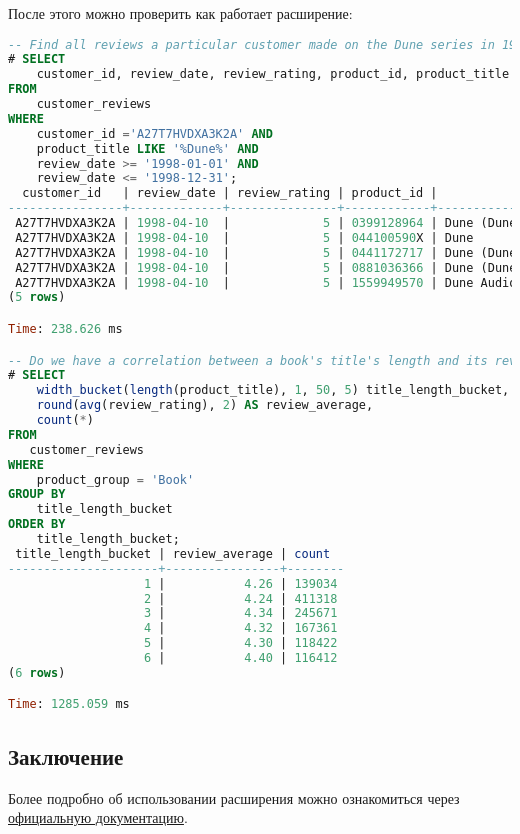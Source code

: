 После этого можно проверить как работает расширение:

\begin{lstlisting}[language=SQL,label=lst:cstore5,caption=Cstore запросы]
-- Find all reviews a particular customer made on the Dune series in 1998.
# SELECT
    customer_id, review_date, review_rating, product_id, product_title
FROM
    customer_reviews
WHERE
    customer_id ='A27T7HVDXA3K2A' AND
    product_title LIKE '%Dune%' AND
    review_date >= '1998-01-01' AND
    review_date <= '1998-12-31';
  customer_id   | review_date | review_rating | product_id |                 product_title
----------------+-------------+---------------+------------+-----------------------------------------------
 A27T7HVDXA3K2A | 1998-04-10  |             5 | 0399128964 | Dune (Dune Chronicles (Econo-Clad Hardcover))
 A27T7HVDXA3K2A | 1998-04-10  |             5 | 044100590X | Dune
 A27T7HVDXA3K2A | 1998-04-10  |             5 | 0441172717 | Dune (Dune Chronicles, Book 1)
 A27T7HVDXA3K2A | 1998-04-10  |             5 | 0881036366 | Dune (Dune Chronicles (Econo-Clad Hardcover))
 A27T7HVDXA3K2A | 1998-04-10  |             5 | 1559949570 | Dune Audio Collection
(5 rows)

Time: 238.626 ms

-- Do we have a correlation between a book's title's length and its review ratings?
# SELECT
    width_bucket(length(product_title), 1, 50, 5) title_length_bucket,
    round(avg(review_rating), 2) AS review_average,
    count(*)
FROM
   customer_reviews
WHERE
    product_group = 'Book'
GROUP BY
    title_length_bucket
ORDER BY
    title_length_bucket;
 title_length_bucket | review_average | count
---------------------+----------------+--------
                   1 |           4.26 | 139034
                   2 |           4.24 | 411318
                   3 |           4.34 | 245671
                   4 |           4.32 | 167361
                   5 |           4.30 | 118422
                   6 |           4.40 | 116412
(6 rows)

Time: 1285.059 ms
\end{lstlisting}


\subsection{Заключение}

Более подробно об использовании расширения можно ознакомиться через \href{https://citusdata.github.io/cstore_fdw/}{официальную документацию}.
